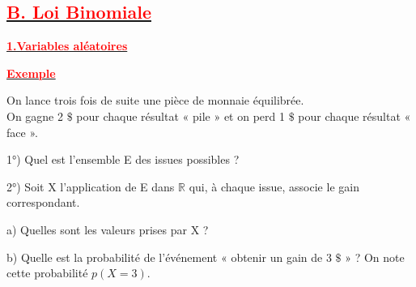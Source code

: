 \documentclass[12pt]{article}
\begin{document}

	
    
    
    
    
    
    
    
\subsection*{\underline{\textbf{\textcolor{red}{B. Loi Binomiale}}}}
\underline{\textbf{\textcolor{red}{1.Variables aléatoires}}}

\underline{\textbf{\textcolor{red}{Exemple}}}

On lance trois fois de suite une pièce de monnaie équilibrée.\\ On gagne 2 $\$ $ pour chaque résultat « pile » et on perd 1 $\$ $ pour chaque résultat « face ».

1°) Quel est l’ensemble E des issues possibles ?

2°) Soit X l’application de E dans $\mathbb{R}$ qui, à chaque issue, associe le gain correspondant.

	a) Quelles sont les valeurs prises par X ?

	b) Quelle est la probabilité de l’événement « obtenir un gain de 3 $\$ $ » ? On note cette probabilité $p(X = 3)$.
	
\end{document}
